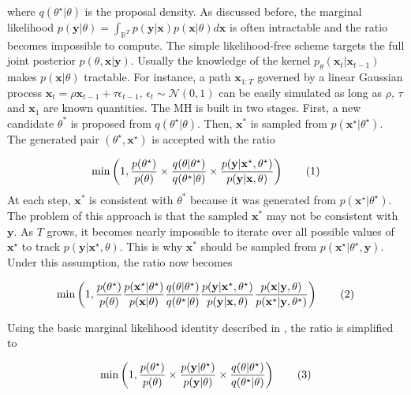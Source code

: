 \documentclass[11pt,a4,twosided,singlespacing,titlepagenumber=on]{scrreprt}
\numberwithin{equation}{chapter} %
\theoremstyle{remark}
\newcommand{\matr}[1]{\mathbf{#1}}
\newcommand\numberthis{\addtocounter{equation}{1}\tag{\theequation}}
\begin{document}
where $q(\theta^\star|\theta)$ is the proposal density. As discussed before, the marginal likelihood $p(\matr{y}|\theta) = \int_{\mathbb{R}^T} p(\matr{y}|\matr{x})p(\matr{x}|\theta) d\matr{x}$ is often intractable and the ratio becomes impossible to compute. The simple likelihood-free scheme targets the full joint posterior $p(\theta,\matr{x}|\matr{y})$. Usually the knowledge of the kernel $p_\theta(\matr{x}_t|\matr{x}_{t-1})$ makes $p(\matr{x}|\theta)$ tractable. For instance, a path $\matr{x}_{1:T}$ governed by a linear Gaussian process $\matr{x}_t = \rho \matr{x}_{t-1} + \tau \epsilon_{t-1} \text{, } \epsilon_t \sim \mathcal{N}(0,1)$ can be easily simulated as long as $\rho$, $\tau$ and $\matr{x}_1$ are known quantities. The MH is built in two stages. First, a new candidate $\theta^*$ is proposed from $q(\theta^\star|\theta)$. Then, $\matr{x}^*$ is sampled from $p(\matr{x}^\star|\theta^\star)$. The generated pair $(\theta^\star,\matr{x}^\star)$ is accepted with the ratio

\begin{align*}
\min \left( 1, \frac{p(\theta^\star)}{p(\theta)} \times  \frac{q(\theta|\theta^\star)}{q(\theta^\star|\theta)} \times \frac{p(\matr{y}|{\matr{x}}^\star,\theta^\star)}{p(\matr{y}|{\matr{x}},\theta)} \right) \numberthis
\end{align*}
At each step, $\matr{x}^*$ is consistent with $\theta^*$ because it was generated from $p(\matr{x}^\star|\theta^\star)$. The problem of this approach is that the sampled $\matr{x}^*$ may not be consistent with $\matr{y}$. As $T$ grows, it becomes nearly impossible to iterate over all possible values of $\matr{x}^\star$ to track $p(\matr{y}|\matr{x}^\star,\theta)$. This is why $\matr{x}^*$ should be sampled from $p(\matr{x}^\star|\theta^\star,\matr{y})$. Under this assumption, the ratio now becomes

\begin{align*}
 \min \left(1, \frac{p(\theta^\star)}{p(\theta)}   \frac{p({\matr{x}}^\star|\theta^\star)}{p({\matr{x}}|\theta)}   \frac{q(\theta|\theta^\star)}{q(\theta^\star|\theta)}   \frac{p(\matr{y}|{\matr{x}}^\star,\theta^\star)}{p(\matr{y}|{\matr{x}},\theta)}  \frac{p({\matr{x}}|\matr{y},\theta)}{p({\matr{x}}^\star|\matr{y},\theta^\star)} \right) \numberthis
\end{align*}

Using the basic marginal likelihood identity described in \cite{chib1995}, the ratio is simplified to

\begin{align*}
 \min \left(1, \frac{p(\theta^\star)}{p(\theta)}  \times \frac{p(\matr{y}|\theta^\star)}{p(\matr{y}|\theta)} \times \frac{q(\theta|\theta^\star)}{q(\theta^\star|\theta)} \right) \numberthis
\end{align*}
\end{document}
